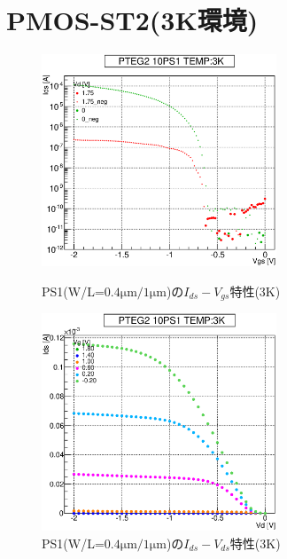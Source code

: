 		\section{PMOS-ST2(3K環境)}
				\begin{figure}[htbp]
					\begin{minipage}{0.5\hsize}
						\begin{center}
							\includegraphics[width=70mm]{./Chapter/Appendix/Picture/PST/PS1/PTEG2_10_PS1_IdVg_3K.eps}
						\end{center}
						\caption{PS1(W/L=$0.4\mathrm{\mu m}/1\mathrm{\mu m}$)の$I_{ds}-V_{gs}$特性(3K)}
						\label{fig:PS1_IdVg_3K}
					\end{minipage}
					\begin{minipage}{0.5\hsize}
						\begin{center}
							\includegraphics[width=70mm]{./Chapter/Appendix/Picture/PST/PS1/PTEG2_10_PS1_IdVd_3K.eps}
						\end{center}
						\caption{PS1(W/L=$0.4\mathrm{\mu m}/1\mathrm{\mu m}$)の$I_{ds}-V_{ds}$特性(3K)}
						\label{fig:PS1_IdVd_3K}
					\end{minipage}
				\end{figure}
